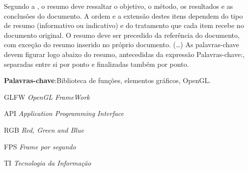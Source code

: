 \documentclass[12pt, %
openright,
oneside, %
a4paper,    %
brazil]{facom-ufu-abntex2}
\begin{document}





\begin{resumo} %
 Segundo a , o resumo deve ressaltar o
 objetivo, o método, os resultados e as conclusões do documento. A ordem e a extensão
 destes itens dependem do tipo de resumo (informativo ou indicativo) e do
 tratamento que cada item recebe no documento original. O resumo deve ser
 precedido da referência do documento, com exceção do resumo inserido no
 próprio documento. (\ldots) As palavras-chave devem figurar logo abaixo do
 resumo, antecedidas da expressão Palavras-chave:, separadas entre si por
 ponto e finalizadas também por ponto.

 \vspace{\onelineskip}

 \noindent
 \textbf{Palavras-chave}:Biblioteca de funções, elementos gráficos, OpenGL. %
\end{resumo}

\listoffigures*
\cleardoublepage

\iffalse
\pdfbookmark[0]{\listtablename}{lot}
\listoftables*
\cleardoublepage
\fi


\begin{siglas} %
  \item[GLFW] \textit{OpenGL FrameWork}
  \item[API] \textit{Application Programming Interface}
  \item[RGB] \textit{Red, Green and Blue}
  \item[FPS] \textit{Frame por segundo}
  \item[TI] \textit{Tecnologia da Informação}
\end{siglas}
\end{document}
